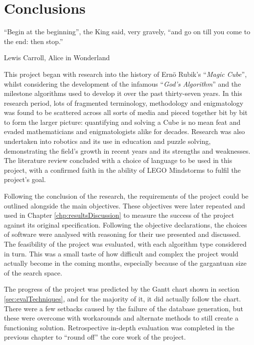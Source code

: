 \documentclass{report}
\newcommand{\tit}[1]{\textit{#1}}
\newcommand{\propernoun}[1]{\enquote{\tit{#1}}}
\newcommand{\lego}{LEGO }
\begin{document}
    \newpage
    \chapter{Conclusions}
   	\epigraph{``Begin at the beginning'', the King said, very gravely, ``and go on till you come to the end: then stop.''}{Lewis Carroll, Alice in Wonderland \cite{Carroll1865}}
    
    This project began with research into the history of Ern\"{o} Rubik's \propernoun{Magic Cube}, whilst considering the development of the infamous \propernoun{God's Algorithm} and the milestone algorithms used to develop it over the past thirty-seven years. In this research period, lots of fragmented terminology, methodology and enigmatology was found to be scattered across all sorts of media and pieced together bit by bit to form the larger picture: quantifying and solving a Cube is no mean feat and evaded mathematicians and enigmatologists alike for decades. Research was also undertaken into robotics and its use in education and puzzle solving, demonstrating the field's growth in recent years and its strengths and weaknesses. The literature review concluded with a choice of language to be used in this project, with a confirmed faith in the ability of \lego Mindstorms to fulfil the project's goal.
    
    Following the conclusion of the research, the requirements of the project could be outlined alongside the main objectives. These objectives were later repeated and used in Chapter \ref{chp:resultsDiscussion} to measure the success of the project against its original specification. Following the objective declarations, the choices of software were analysed with reasoning for their use presented and discussed. The feasibility of the project was evaluated, with each algorithm type considered in turn. This was a small taste of how difficult and complex the project would actually become in the coming months, especially because of the gargantuan size of the search space.
    
    The progress of the project was predicted by the Gantt chart shown in section \ref{sec:evalTechniques}, and for the majority of it, it did actually follow the chart. There were a few setbacks caused by the failure of the database generation, but these were overcome with workarounds and alternate methods to still create a functioning solution. Retrospective in-depth evaluation was completed in the previous chapter to \enquote{round off} the core work of the project.
    
\end{document}
